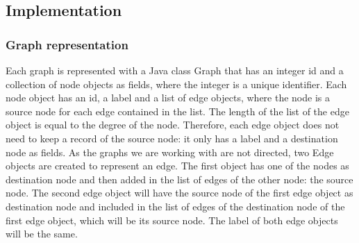\documentclass{l4proj}
\begin{document}
\subsection{Implementation}
\label{path-index:implementation}
\subsubsection{Graph representation}
\label{path-index:graph-representation}
	Each graph is represented with a Java class \textrm{Graph} that has an integer id and a collection of node objects as fields, where the integer is a unique identifier. Each node object has an id, a label and a list of edge objects, where the node is a source node for each edge contained in the list. The length of the list of the edge object is equal to the degree of the node. Therefore, each edge object does not need to keep a record of the source node: it only has a label and a destination node as fields. As the graphs we are working with are not directed, two Edge objects are created to represent an edge. The first object has one of the nodes as destination node and then added in the list of edges of the other node: the source node. The second edge object will have the source node of the first edge object as destination node and included in the list of edges of the destination node of the first edge object, which will be its source node. The label of both edge objects will be the same.\par
\end{document}
